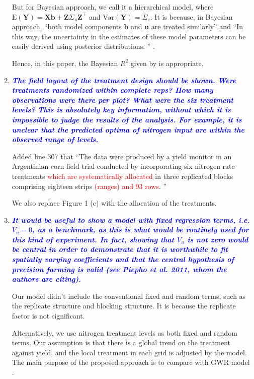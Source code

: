 \documentclass[a4paper]{article}   	%
\newcommand{\E}{\mathrm{E}}
\newcommand{\Var}{\mathrm{Var}}
\newcommand{\qtitle}[1]{\textit{\textbf{#1}}}
\begin{document}
\begin{enumerate}
	But for Bayesian approach, we call it a hierarchical model, where $\E(\bm{Y}) = \bm{X}\bm{b} + \bm{Z}\Sigma_u\bm{Z}^\top$ and $\Var(\bm{Y}) = \Sigma_e$. It is because, in Bayesian approach, ``both model components $\bm{b}$ and $\bm{u}$ are treated similarly'' and ``In this way, the uncertainty in the estimates of these model parameters can be easily derived using posterior distributions. '' \parencite{Burkner2017Brms}. 

    Hence, in this paper, the Bayesian $R^2$ given by \textcite{Gelman2019Rsquared} is appropriate. 
    
    \item \qtitle{\textcolor{blue}{The field layout of the treatment design should be shown. Were treatments randomized within complete reps? How many observations were there per plot? What were the six treatment levels? This is absolutely key information, without which it is impossible to judge the results of the analysis. For example, it is unclear that the predicted optima of nitrogen input are within the observed range of levels.}}

    Added line 307 that ``The data were produced by a yield monitor in an Argentinian corn field trial conducted by incorporating six nitrogen rate treatments \textcolor{red}{which are systematically allocated} in three replicated blocks comprising eighteen strips \textcolor{red}{(ranges) and 93 rows}. ''
    
    We also replace Figure 1 (c) with the allocation of the treatments. 
    
    \item \qtitle{\textcolor{blue}{It would be useful to show a model with fixed regression terms, i.e. $V_u = 0$, as a benchmark, as this is what would be routinely used for this kind of experiment. In fact, showing that $V_u$ is not zero would be central in order to demonstrate that it is worthwhile to fit spatially varying coefficients and that the central hypothesis of precision farming is valid (see Piepho et al. 2011, whom the authors are citing).}}

    Our model didn't include the conventional fixed and random terms, such as the replicate structure and blocking structure. It is because the replicate factor is not significant. 
    
    Alternatively, we use nitrogen treatment levels as both fixed and random terms. Our assumption is that there is a global trend on the treatment against yield, and the local treatment in each grid is adjusted by the model. The main purpose of the proposed approach is to compare with GWR model \parencite{Rakshit2020Novel}.


\end{enumerate}
\end{document}
